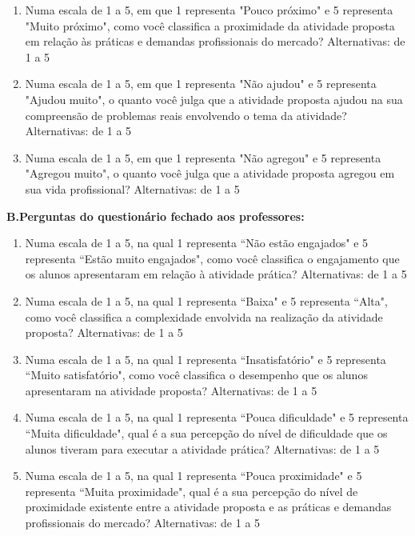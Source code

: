 \begin{enumerate}
    \item Numa escala de 1 a 5, em que 1 representa "Pouco próximo" e 5 representa "Muito próximo", como você classifica a proximidade da atividade proposta em relação às práticas e demandas profissionais do mercado?
    Alternativas: de 1 a 5
    
    \item Numa escala de 1 a 5, em que 1 representa "Não ajudou" e 5 representa "Ajudou muito", o quanto você julga que a atividade proposta ajudou na sua compreensão de problemas reais envolvendo o tema da atividade?
    Alternativas: de 1 a 5
    
    \item Numa escala de 1 a 5, em que 1 representa "Não agregou" e 5 representa "Agregou muito", o quanto você julga que a atividade proposta agregou em sua vida profissional?
    Alternativas: de 1 a 5
\end{enumerate}
\textbf{B.\quad Perguntas do questionário fechado aos professores:}
\begin{enumerate}
    \item Numa escala de 1 a 5, na qual 1 representa ``Não estão engajados" e 5 representa ``Estão muito engajados", como você classifica o engajamento que os alunos apresentaram em relação à atividade prática?
    Alternativas: de 1 a 5
    
    \item Numa escala de 1 a 5, na qual 1 representa ``Baixa" e 5 representa ``Alta",  como você classifica a complexidade envolvida na realização da atividade proposta?
    Alternativas: de 1 a 5
    
    \item Numa escala de 1 a 5, na qual 1 representa ``Insatisfatório" e 5 representa ``Muito satisfatório", como você classifica o desempenho que os alunos apresentaram na atividade proposta?
    Alternativas: de 1 a 5
    
    \item Numa escala de 1 a 5, na qual 1 representa ``Pouca dificuldade" e 5 representa ``Muita dificuldade", qual é a sua percepção do nível de dificuldade que os alunos tiveram para executar a atividade prática?
    Alternativas: de 1 a 5
    
    \item Numa escala de 1 a 5, na qual 1 representa ``Pouca proximidade" e 5 representa ``Muita proximidade", qual é a sua percepção do nível de proximidade existente entre a atividade proposta e as práticas e demandas profissionais do mercado?
    Alternativas: de 1 a 5
\end{enumerate}
